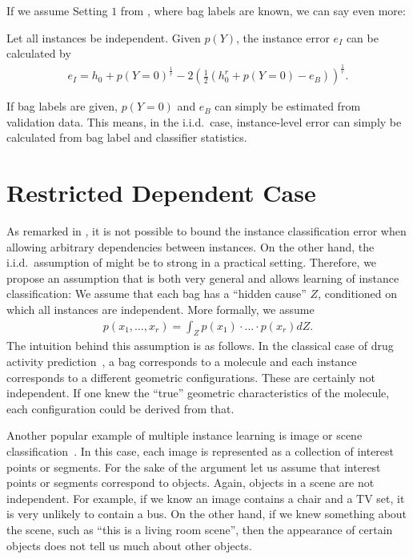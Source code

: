 If we assume Setting $1$ from , where bag labels are known, we can say even more:
\begin{theorem}\label{equality}
Let all instances be independent. Given $p(Y)$, the instance error $e_I$ can be calculated by
\begin{align}
e_I = h_0 + p(Y=0)^\frac{1}{r} - 2 \left (\frac{1}{2} ( h_0^r + p(Y=0) - e_B) \right)^\frac{1}{r}.
\end{align}
\end{theorem}
If bag labels are given, $p(Y=0)$ and $ e_B$ can simply be estimated from validation data.
This means, in the i.i.d.\ case, instance-level error can simply be calculated from bag label and classifier statistics.

\section{Restricted Dependent Case}
As remarked in , it is not possible to bound the instance classification error
when allowing arbitrary dependencies between instances. On the other hand, the i.i.d.\ assumption of 
might be to strong in a practical setting.
Therefore, we propose an assumption that is both very general and allows learning of instance classification:
We assume that each bag has a ``hidden cause'' $Z$, conditioned on which all instances are independent.
More formally, we assume
\begin{align}
    p(x_1,\dotsc,x_r)=\int_Z p(x_1)\cdot \dotsc \cdot p(x_r) dZ.
\end{align}
The intuition behind this assumption is as follows. In the classical case of drug activity prediction~\citep{dietterich1997solving}, a bag corresponds
to a molecule and each instance corresponds to a different geometric configurations. These are certainly not independent.
If one knew the ``true'' geometric characteristics of the molecule, each configuration could be derived from that.

Another popular example of multiple instance learning is image or scene classification~\citep{zhou2007multi,zha2008joint,zhou2009multi}.
In this case, each image
is represented as a collection of interest points or segments.
For the sake of the argument let us assume that interest points or segments correspond to objects.
Again, objects in a scene are not independent. For example, if we know an image contains a chair and a TV set,
it is very unlikely to contain a bus.
On the other hand, if we knew something about the scene, such as ``this is a living room scene'', then the appearance
of certain objects does not tell us much about other objects.

